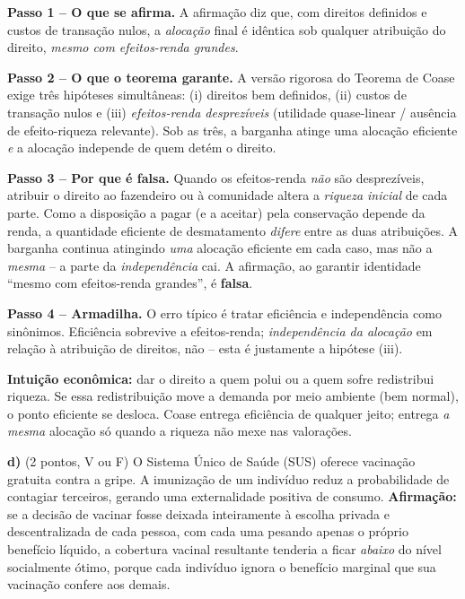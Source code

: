 \begin{solucao}
\textbf{Passo 1 -- O que se afirma.} A afirma\c{c}\~ao diz que, com direitos definidos e custos de transa\c{c}\~ao nulos, a \emph{aloca\c{c}\~ao} final \'e id\^entica sob qualquer atribui\c{c}\~ao do direito, \emph{mesmo com efeitos-renda grandes}.

\textbf{Passo 2 -- O que o teorema garante.} A vers\~ao rigorosa do Teorema de Coase exige tr\^es hip\'oteses simult\^aneas: (i) direitos bem definidos, (ii) custos de transa\c{c}\~ao nulos e (iii) \emph{efeitos-renda desprez\'iveis} (utilidade quase-linear / aus\^encia de efeito-riqueza relevante). Sob as tr\^es, a barganha atinge uma aloca\c{c}\~ao eficiente \emph{e} a aloca\c{c}\~ao independe de quem det\'em o direito.

\textbf{Passo 3 -- Por que \'e falsa.} Quando os efeitos-renda \emph{n\~ao} s\~ao desprez\'iveis, atribuir o direito ao fazendeiro ou \`a comunidade altera a \emph{riqueza inicial} de cada parte. Como a disposi\c{c}\~ao a pagar (e a aceitar) pela conserva\c{c}\~ao depende da renda, a quantidade eficiente de desmatamento \emph{difere} entre as duas atribui\c{c}\~oes. A barganha continua atingindo \emph{uma} aloca\c{c}\~ao eficiente em cada caso, mas n\~ao a \emph{mesma} -- a parte da \emph{independ\^encia} cai. A afirma\c{c}\~ao, ao garantir identidade ``mesmo com efeitos-renda grandes'', \'e \textbf{falsa}.

\textbf{Passo 4 -- Armadilha.} O erro t\'ipico \'e tratar efici\^encia e independ\^encia como sin\^onimos. Efici\^encia sobrevive a efeitos-renda; \emph{independ\^encia da aloca\c{c}\~ao} em rela\c{c}\~ao \`a atribui\c{c}\~ao de direitos, n\~ao -- esta \'e justamente a hip\'otese (iii).

\textbf{Intui\c{c}\~ao econ\^omica:} dar o direito a quem polui ou a quem sofre redistribui riqueza. Se essa redistribui\c{c}\~ao move a demanda por meio ambiente (bem normal), o ponto eficiente se desloca. Coase entrega efici\^encia de qualquer jeito; entrega \emph{a mesma} aloca\c{c}\~ao s\'o quando a riqueza n\~ao mexe nas valora\c{c}\~oes.
\end{solucao}

\textbf{d)} (2 pontos, V ou F) O Sistema \'Unico de Sa\'ude (SUS) oferece vacina\c{c}\~ao gratuita contra a gripe. A imuniza\c{c}\~ao de um indiv\'iduo reduz a probabilidade de contagiar terceiros, gerando uma externalidade positiva de consumo. \textbf{Afirma\c{c}\~ao:} se a decis\~ao de vacinar fosse deixada inteiramente \`a escolha privada e descentralizada de cada pessoa, com cada uma pesando apenas o pr\'oprio benef\'icio l\'iquido, a cobertura vacinal resultante tenderia a ficar \emph{abaixo} do n\'ivel socialmente \'otimo, porque cada indiv\'iduo ignora o benef\'icio marginal que sua vacina\c{c}\~ao confere aos demais.

